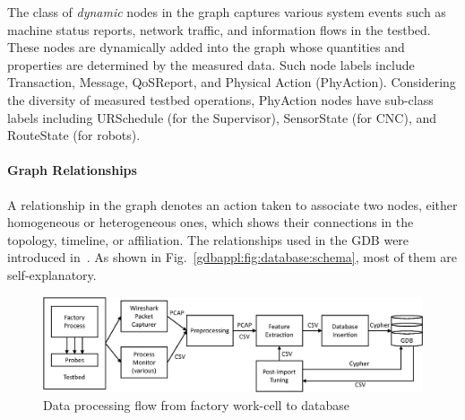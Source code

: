 The class of \textit{dynamic} nodes in the graph captures various system events such as machine status reports, network traffic, and information flows in the testbed. These nodes are dynamically added into the graph whose quantities and properties are determined by the measured data. Such node labels include Transaction, Message, QoSReport, and Physical Action (PhyAction). Considering the diversity of measured testbed operations, PhyAction nodes have sub-class labels including URSchedule (for the Supervisor), SensorState (for CNC), and RouteState (for robots).


\paragraph{Graph Relationships}

A relationship in the graph denotes an action taken to associate two nodes, either homogeneous or heterogeneous ones, which shows their connections in the topology, timeline, or affiliation. The relationships used in the GDB were introduced in~\cite{Candell2020}. As shown in Fig.~\ref{gdbappl:fig:database:schema}, most of them are self-explanatory. 

\begin{figure}
	\centering
	\includegraphics[width=\textwidth]{chapter-gdb-appl/figures/info_workflow_tii.eps}
	\caption{Data processing flow from factory work-cell to database}
	\label{gdbappl:fig:database:work-flow}
\end{figure}

